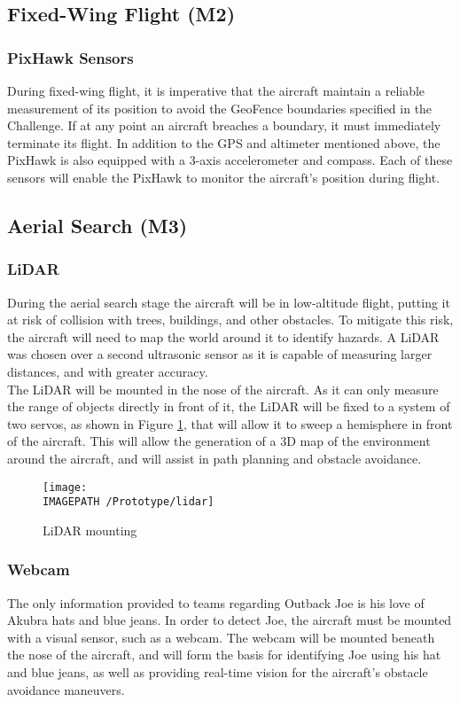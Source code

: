 \subsection{Fixed-Wing Flight (M2)}
\subsubsection*{PixHawk Sensors}
During fixed-wing flight, it is imperative that the aircraft maintain a reliable measurement of its position to avoid the GeoFence boundaries specified in the Challenge. If at any point an aircraft breaches a boundary, it must immediately terminate its flight. In addition to the GPS and altimeter mentioned above, the PixHawk is also equipped with a 3-axis accelerometer and compass. Each of these sensors will enable the PixHawk to monitor the aircraft's position during flight.

\subsection{Aerial Search (M3)}
\subsubsection*{LiDAR}
During the aerial search stage the aircraft will be in low-altitude flight, putting it at risk of collision with trees, buildings, and other obstacles. To mitigate this risk, the aircraft will need to map the world around it to identify hazards. A LiDAR was chosen over a second ultrasonic sensor as it is capable of measuring larger distances, and with greater accuracy.\\

The LiDAR will be mounted in the nose of the aircraft. As it can only measure the range of objects directly in front of it, the LiDAR will be fixed to a system of two servos, as shown in Figure \ref{fig:lidar}, that will allow it to sweep a hemisphere in front of the aircraft. This will allow the generation of a 3D map of the environment around the aircraft, and will assist in path planning and obstacle avoidance.

\begin{figure}[!ht]
	\centering
	\texttt{[image: \\IMAGEPATH /Prototype/lidar]}
	\caption{LiDAR mounting}
	\label{fig:lidar}
\end{figure}

\subsubsection*{Webcam}
The only information provided to teams regarding Outback Joe is his love of Akubra hats and blue jeans. In order to detect Joe, the aircraft must be mounted with a visual sensor, such as a webcam. The webcam will be mounted beneath the nose of the aircraft, and will form the basis for identifying Joe using his hat and blue jeans, as well as providing real-time vision for the aircraft's obstacle avoidance maneuvers.

